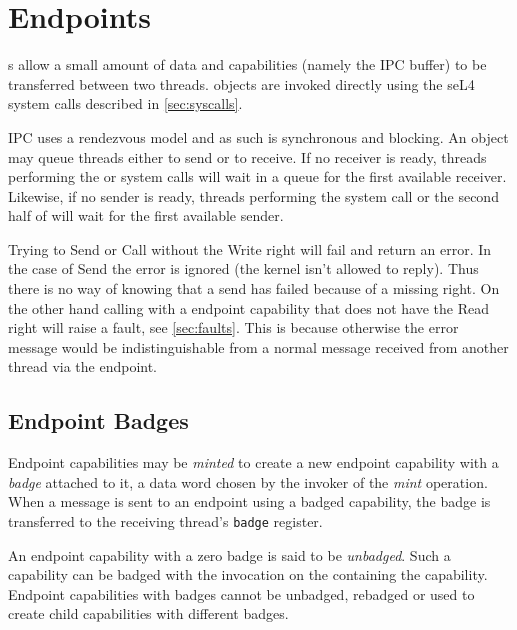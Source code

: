 \section{Endpoints}

s allow a small amount
of data and capabilities (namely the IPC buffer) to be transferred between two
threads.  objects are invoked directly using the seL4 system calls
described in \autoref{sec:syscalls}.

IPC  uses a rendezvous model and as such is
synchronous and blocking. An  object  may queue
threads either to send or to receive. If no receiver is ready, threads
performing the  or 
system calls will wait in a queue for the first available receiver. Likewise, if
no sender is ready, threads performing the 
system call or the second half of 
will wait for the first available sender.

Trying to Send or Call without the Write right will fail and return an error. In
the case of Send the error is ignored (the kernel isn't allowed to reply). Thus
there is no way of knowing that a send has failed because of a missing right.
On the other hand calling  with a endpoint capability that
does not have the Read right will raise a fault, see \autoref{sec:faults}. This is
because otherwise the error message would be indistinguishable from a normal
message received from another thread via the endpoint.

\subsection{Endpoint Badges\label{s:ep-badge}}
\label{sec:ep-badges}

Endpoint capabilities may be \emph{minted} to
create a new endpoint capability with a \emph{badge} attached to it, a data
word chosen by the invoker of the \emph{mint} operation. When a message is sent to an endpoint using a badged
capability, the badge is transferred to the receiving thread's
\texttt{badge} register.

An endpoint capability with a zero badge is said to be \emph{unbadged}.
Such a capability can be badged with the 
invocation on the  containing the capability. Endpoint
capabilities with badges cannot be unbadged, rebadged or used to create
child capabilities with different badges.

